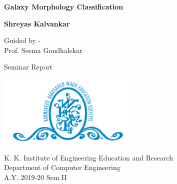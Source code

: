 \begin{titlepage}
    \begin{center}
        \vspace*{0.5in}
        
        \Huge
        \textbf{Galaxy Morphology Classification}
        \vspace{0.2in}
        
        \normalsize
        \textbf{Shreyas Kalvankar}
        
        \vspace{0.5cm}
        Guided by - \\
        Prof. Seema Gondhalekar
        
        \vspace*{1.25in}
        
        
        \huge
        Seminar Report
        
        \vspace*{1.25in}
        \footnotesize
        \begin{center}
             \includegraphics[width=0.5\textwidth]{figures/Logo.png}
        \end{center}
        K. K. Institute of Engineering Education and Research\\
        Department of Computer Engineering\\
        A.Y. 2019-20 Sem II
    \end{center}
\end{titlepage}